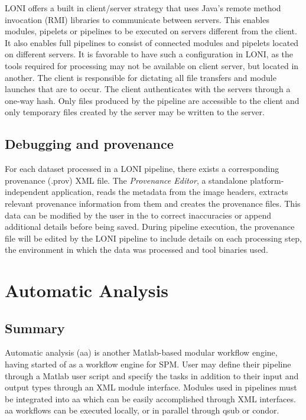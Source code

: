 \documentclass{report}
\begin{document}
       LONI offers a built in client/server strategy that uses Java's remote
method invocation (RMI) libraries to communicate between servers. This enables
modules, pipelets or pipelines to be executed on servers different from the
client. It also enables full pipelines to consist of connected modules and
pipelets located on different servers. It is favorable to have such a
configuration in LONI, as the tools required for processing may not be available
on client server, but located in another. The client is responsible for
dictating all file transfers and module launches that are to occur. The client
authenticates with the servers through a one-way hash. Only files produced by
the pipeline are accessible to the client and only temporary files created by
the server may be written to the server.

        \subsection{Debugging and provenance}
        For each dataset processed in a LONI pipeline, there exists a corresponding
provenance (.prov) XML file. The \textit{Provenance Editor}, a standalone
platform-independent application, reads the metadata from the image headers,
extracts relevant provenance information from them and creates the provenance files. 
This data can be modified by the user in the to correct inaccuracies or append
additional details before being saved. During pipeline execution, the provenance
file will be edited by the LONI pipeline to include details on each processing
step, the environment in which the data was processed and tool binaries used. 

    \section{Automatic Analysis}
        \subsection{Summary}
        Automatic analysis (aa) is another Matlab-based modular workflow engine,
having started of as a workflow engine for SPM. User may define their pipeline
through a Matlab user script and specify the tasks in addition to their input
and output types through an XML module interface. Modules used in pipelines must
be integrated into aa which can be easily accomplished through XML interfaces.
aa workflows can be executed locally, or in parallel through qsub or condor.
\end{document}
